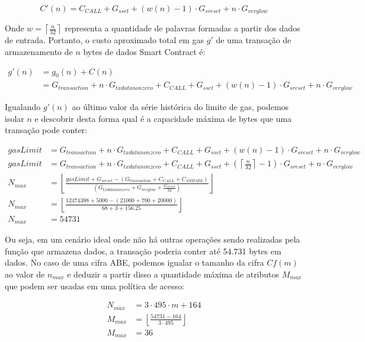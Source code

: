 \documentclass[a4paper,11pt]{article}
\begin{document}
\[ C'(n) = C_{CALL} + G_{sset} +  ( w(n) - 1 ) \cdot G_{sreset} + n \cdot G_{verylow} \]

Onde $w = \left\lceil \frac{n}{32} \right\rceil $ representa a quantidade de palavras formadas a partir dos dados de entrada.
Portanto, o custo aproximado total em gas $g'$ de uma transação de armazenamento de $n$ bytes de dados Smart Contract é:

\begin{equation}
  \begin{aligned}
    g'(n) & = g_{0}(n) + C(n)\\
      & = G_{transaction} + n \cdot G_{txdatanonzero} + C_{CALL} + G_{sset} +  ( w(n) - 1 ) \cdot G_{sreset} + n \cdot G_{verylow}
  \end{aligned}
\end{equation}

Igualando $g'(n)$ ao último valor da série histórica do limite de gas, podemos isolar $n$ e descobrir desta forma qual é a capacidade máxima de bytes que uma transação pode conter:

\begin{equation}
  \begin{aligned}
    gasLimit & = G_{transaction} + n \cdot G_{txdatanonzero} + C_{CALL} + G_{sset} +  ( w(n) - 1 ) \cdot G_{sreset} + n \cdot G_{verylow} \\
    gasLimit & = G_{transaction} + n \cdot G_{txdatanonzero} + C_{CALL} + G_{sset} +  ( \left\lceil \frac{n}{32} \right\rceil - 1 ) \cdot G_{sreset} + n \cdot G_{verylow} \\
     N_{max} & = \left\lfloor \frac{gasLimit + G_{sreset} - (G_{transaction} + C_{CALL} + C_{SSTORE})}{(G_{txdatanonzero} + G_{verylow} + \frac{G_{sreset}}{32})} \right\rfloor \\
     N_{max} & = \left\lfloor \frac{12474388 + 5000 - (21000 + 700 + 20000)}{68 + 3 + 156.25} \right\rfloor \\
     N_{max} & = 54731
  \end{aligned}
\end{equation}

Ou seja, em um cenário ideal onde não há outras operações sendo realizadas pela função que armazena dados, a transação poderia conter até 54.731 bytes em dados.
No caso de uma cifra ABE, podemos igualar o tamanho da cifra $Cf(m)$ ao valor de $n_{max}$ e deduzir a partir disso a quantidade máxima de atributos $M_{max}$ que podem ser usadas em uma política de acesso:

\begin{equation}
  \begin{aligned}
    N_{max} & = 3 \cdot 495 \cdot m + 164 \\
    M_{max} & = \left\lfloor \frac{54731 - 164}{3 \cdot 495} \right\rfloor \\
    M_{max} & = 36
  \end{aligned}
\end{equation}
\end{document}
